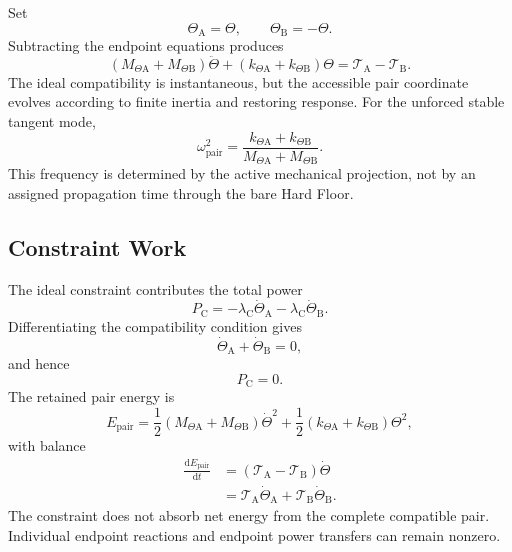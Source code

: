 Set
\begin{equation}
    \Theta_{\mathrm A}=\Theta,
    \qquad
    \Theta_{\mathrm B}=-\Theta.
\end{equation}
Subtracting the endpoint equations produces
\begin{equation}
    \boxed{
    (M_{\Theta\mathrm A}+M_{\Theta\mathrm B})\ddot\Theta
    +(k_{\Theta\mathrm A}+k_{\Theta\mathrm B})\Theta
    =\mathcal T_{\mathrm A}-\mathcal T_{\mathrm B}
    }.
\end{equation}
The ideal compatibility is instantaneous, but the accessible pair coordinate evolves according to finite inertia and restoring response. For the unforced stable tangent mode,
\begin{equation}
    \boxed{
    \omega_{\mathrm{pair}}^2
    =\frac{k_{\Theta\mathrm A}+k_{\Theta\mathrm B}}
    {M_{\Theta\mathrm A}+M_{\Theta\mathrm B}}
    }.
\end{equation}
This frequency is determined by the active mechanical projection, not by an assigned propagation time through the bare Hard Floor.

\subsection{Constraint Work}

The ideal constraint contributes the total power
\begin{equation}
    P_{\mathrm C}
    =-\lambda_{\mathrm C}\dot\Theta_{\mathrm A}
     -\lambda_{\mathrm C}\dot\Theta_{\mathrm B}.
\end{equation}
Differentiating the compatibility condition gives
\begin{equation}
    \dot\Theta_{\mathrm A}+\dot\Theta_{\mathrm B}=0,
\end{equation}
and hence
\begin{equation}
    \boxed{P_{\mathrm C}=0}.
\end{equation}
The retained pair energy is
\begin{equation}
    E_{\mathrm{pair}}
    =\frac12(M_{\Theta\mathrm A}+M_{\Theta\mathrm B})\dot\Theta^2
     +\frac12(k_{\Theta\mathrm A}+k_{\Theta\mathrm B})\Theta^2,
\end{equation}
with balance
\begin{equation}
    \boxed{
    \begin{aligned}
    \frac{\mathrm dE_{\mathrm{pair}}}{\mathrm dt}
    &=(\mathcal T_{\mathrm A}-\mathcal T_{\mathrm B})\dot\Theta\\
    &=\mathcal T_{\mathrm A}\dot\Theta_{\mathrm A}
      +\mathcal T_{\mathrm B}\dot\Theta_{\mathrm B}.
    \end{aligned}
    }
\end{equation}
The constraint does not absorb net energy from the complete compatible pair. Individual endpoint reactions and endpoint power transfers can remain nonzero.

